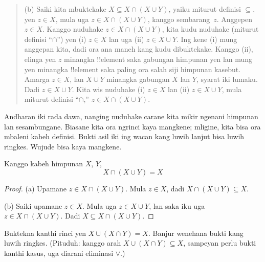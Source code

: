\documentclass[../../../include/open-logic-section]{subfiles}
\begin{document}
\begin{explain}
\begin{quote}
(b) Saiki kita mbuktekake $X \subseteq X \cap (X \cup Y)$,
yaiku miturut definisi $\subseteq$, yen $z \in X$, mula uga
$z \in X \cap (X \cup Y)$, kanggo sembarang~$z$.
Anggepen $z \in X$. Kanggo nuduhake $z \in X \cap (X \cup Y)$,
kita kudu nuduhake (miturut definisi ``$\cap$'') yen (i) $z \in X$
lan uga (ii) $z \in X \cup Y$. Ing kene (i) mung anggepan kita,
dadi ora ana maneh kang kudu dibuktekake. Kanggo (ii), elinga yen $z$
minangka !!{element} saka gabungan himpunan yen lan mung yen
minangka !!{element} saka paling ora salah siji himpunan kasebut.
Amarga $z \in X$, lan $X \cup Y$ minangka gabungan $X$ lan $Y$,
syarat iki lumaku. Dadi $z \in X \cup Y$. Kita wis nuduhake
(i) $z \in X$ lan (ii) $z \in X \cup Y$, mula miturut definisi
``$\cap$,'' $z \in X \cap (X \cup Y)$.
\end{quote}

Andharan iki rada dawa, nanging nuduhake carane kita mikir ngenani
himpunan lan sesambungane. Biasane kita ora ngrinci kaya mangkene;
mligine, kita bisa ora mbaleni kabeh definisi. Bukti asil iki ing
wacan kang luwih lanjut bisa luwih ringkes. Wujude bisa kaya mangkene.
\end{explain}

\begin{prop}[Panyerepan]
Kanggo kabeh himpunan $X$, $Y$,
\[
X \cap (X \cup Y) = X
\]
\end{prop}

\begin{proof}
(a) Upamane $z \in X \cap (X \cup Y)$. Mula $z \in X$, dadi
$X \cap (X \cup Y) \subseteq X$.

(b) Saiki upamane $z \in X$. Mula uga $z \in X \cup Y$,
lan saka iku uga $z \in X \cap (X \cup Y)$.
Dadi $X \subseteq X \cap (X \cup Y)$.
\end{proof}

\begin{prob}
Buktekna kanthi rinci yen $X \cup (X \cap Y) = X$.
Banjur wenehana bukti kang luwih ringkes. (Pituduh: kanggo arah
$X \cup (X \cap Y) \subseteq X$, sampeyan perlu bukti kanthi
kasus, uga diarani eliminasi $\lor$.)
\end{prob}
\end{document}
